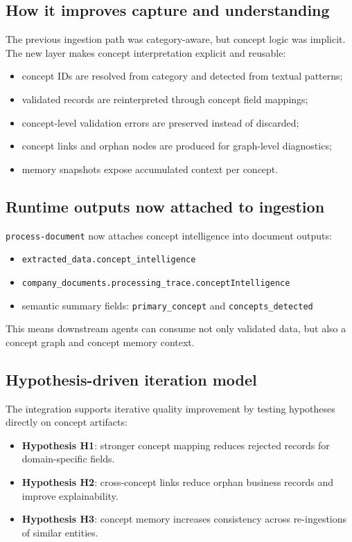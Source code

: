 \documentclass[11pt,a4paper]{article}
\begin{document}
\subsection{How it improves capture and understanding}
The previous ingestion path was category-aware, but concept logic was implicit. The new layer makes concept interpretation explicit and reusable:
\begin{itemize}[leftmargin=*]
  \item concept IDs are resolved from category and detected from textual patterns;
  \item validated records are reinterpreted through concept field mappings;
  \item concept-level validation errors are preserved instead of discarded;
  \item concept links and orphan nodes are produced for graph-level diagnostics;
  \item memory snapshots expose accumulated context per concept.
\end{itemize}

\subsection{Runtime outputs now attached to ingestion}
\texttt{process-document} now attaches concept intelligence into document outputs:
\begin{itemize}[leftmargin=*]
  \item \texttt{extracted\_data.concept\_intelligence}
  \item \texttt{company\_documents.processing\_trace.conceptIntelligence}
  \item semantic summary fields: \texttt{primary\_concept} and \texttt{concepts\_detected}
\end{itemize}

This means downstream agents can consume not only validated data, but also a concept graph and concept memory context.

\subsection{Hypothesis-driven iteration model}
The integration supports iterative quality improvement by testing hypotheses directly on concept artifacts:
\begin{itemize}[leftmargin=*]
  \item \textbf{Hypothesis H1}: stronger concept mapping reduces rejected records for domain-specific fields.
  \item \textbf{Hypothesis H2}: cross-concept links reduce orphan business records and improve explainability.
  \item \textbf{Hypothesis H3}: concept memory increases consistency across re-ingestions of similar entities.
\end{itemize}
\end{document}
